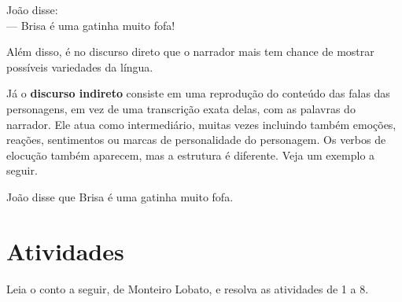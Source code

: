 {\begin{myquote}
João disse:\\
--- Brisa é uma gatinha muito fofa!
\end{myquote}

Além disso, é no discurso direto que o narrador mais tem chance de mostrar
possíveis variedades da língua.

Já o \textbf{discurso indireto} consiste em uma reprodução do conteúdo das falas das
personagens, em vez de uma transcrição exata delas, com as palavras do
narrador. Ele atua como intermediário, muitas vezes incluindo também
emoções, reações, sentimentos ou marcas de personalidade do personagem.
Os verbos de elocução também aparecem, mas a estrutura é diferente.
Veja um exemplo a seguir.

\begin{myquote}
João disse que Brisa é uma gatinha muito fofa.
\end{myquote}
}

\pagebreak
\section*{Atividades}

Leia o conto a seguir, de Monteiro Lobato, e resolva as atividades de 1 a 8.



